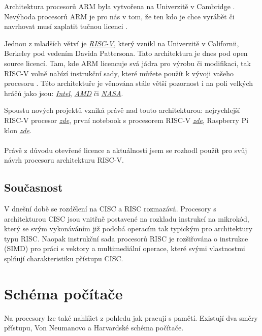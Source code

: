 \documentclass[FM,BP]{tulthesis}
\begin{document}
Architektura procesorů ARM byla vytvořena na Univerzitě v Cambridge \cite{Kumarsahoo472022}. Nevýhoda procesorů ARM je pro nás v tom, že ten kdo je chce vyrábět či navrhovat musí zaplatit tučnou licenci \cite{ARM_licence}.

Jednou z mladších větví je \href{https://en.wikipedia.org/wiki/RISC-V}{\emph{RISC-V}}, který vznikl na Univerzitě v Californii, Berkeley pod vedením Davida Pattersona. Tato architektura je dnes pod open source licencí. Tam, kde ARM licencuje svá jádra pro výrobu či modifikaci, tak RISC-V volně nabízí instrukční sady, které můžete použít k vývoji vašeho procesoru \cite{RISC-V_history}. 
Této architektuře je věnována stále větší pozornost i na poli velkých hráčů jako jsou:  
\href{https://pathfinder.intel.com}{\emph{Intel}},
\href{https://circuitcellar.com/newsletter/amd-is-hiring-risc-v-cpu-developers/}{\emph{AMD}} či
\href{https://www.sifive.com/press/nasa-selects-sifive-and-makes-risc-v-the-go-to-ecosystem}{\emph{NASA}}.

Spoustu nových projektů vzniká právě nad touto architekturou:
nejrychlejší RISC-V procesor
\href{https://www.cnews.cz/zatim-nejrychlejsi-procesor-risc-v-na-svete-vyrabi-ho-intel-na-4nm-procesu-umi-pcie-5-0-i-ddr5/}{\emph{zde}}, první notebook s procesorem RISC-V
\href{https://www.tomshardware.com/news/risc-v-laptop-world-first}{\emph{zde}},
Raspberry Pi klon
\href{https://www.czc.cz/radxa-rock-4-se-4gb/359880/produkt?gclid=Cj0KCQiAi8KfBhCuARIsADp-A54p9OKqDmKCbrRN9vUVP0A1xcUF1QDlwx-Gjsei9Vh2oUKDrGFNSIcaAoffEALw_wcB}{\emph{zde}}.

\paragraph{}
Právě z důvodu otevřené licence a aktuálnosti jsem se rozhodl použít pro svůj návrh procesoru architekturu RISC-V.

\subsection{Současnost}
V dnešní době se rozdělení na CISC a RISC rozmazává. Procesory s architekturou CISC jsou vnitřně postavené na rozkladu instrukcí na mikrokód, který se svým vykonáváním již podobá operacím tak typickým pro architektury typu RISC.
Naopak instrukční sada procesorů RISC je rozšiřována o instrukce (SIMD) pro práci s vektory a multimediální operace, které svými vlastnostmi splňují charakteristiku přístupu CISC. 

\newpage
\section{Schéma počítače}
Na procesory lze také nahlížet z pohledu jak pracují s pamětí. Existují dva směry přístupu, Von Neumanovo a Harvardské schéma počítače. 
\end{document}

